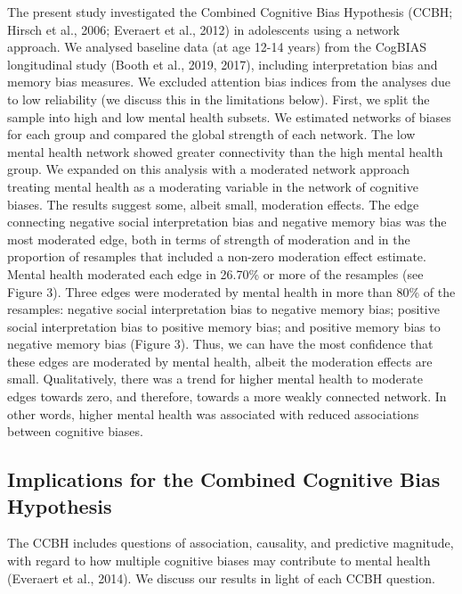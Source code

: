 \documentclass[
  english,
  man,floatsintext]{apa6}
\begin{document}
The present study investigated the Combined Cognitive Bias Hypothesis (CCBH; Hirsch et al., 2006; Everaert et al., 2012) in adolescents using a network approach. We analysed baseline data (at age 12-14 years) from the CogBIAS longitudinal study (Booth et al., 2019, 2017), including interpretation bias and memory bias measures. We excluded attention bias indices from the analyses due to low reliability (we discuss this in the limitations below). First, we split the sample into high and low mental health subsets. We estimated networks of biases for each group and compared the global strength of each network. The low mental health network showed greater connectivity than the high mental health group. We expanded on this analysis with a moderated network approach treating mental health as a moderating variable in the network of cognitive biases. The results suggest some, albeit small, moderation effects. The edge connecting negative social interpretation bias and negative memory bias was the most moderated edge, both in terms of strength of moderation and in the proportion of resamples that included a non-zero moderation effect estimate. Mental health moderated each edge in 26.70\% or more of the resamples (see Figure 3). Three edges were moderated by mental health in more than 80\% of the resamples: negative social interpretation bias to negative memory bias; positive social interpretation bias to positive memory bias; and positive memory bias to negative memory bias (Figure 3). Thus, we can have the most confidence that these edges are moderated by mental health, albeit the moderation effects are small. Qualitatively, there was a trend for higher mental health to moderate edges towards zero, and therefore, towards a more weakly connected network. In other words, higher mental health was associated with reduced associations between cognitive biases.

\hypertarget{implications-for-the-combined-cognitive-bias-hypothesis}{%
\subsection{Implications for the Combined Cognitive Bias Hypothesis}\label{implications-for-the-combined-cognitive-bias-hypothesis}}

The CCBH includes questions of association, causality, and predictive magnitude, with regard to how multiple cognitive biases may contribute to mental health (Everaert et al., 2014). We discuss our results in light of each CCBH question.
\end{document}
